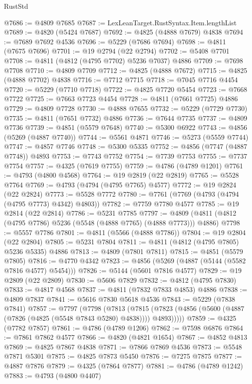 \begin{lexlean}{RustStd}
\begin{coremodule}
@7686 := @4809 @7685
@7687 := LexLeanTarget.RustSyntax.Item.lengthList
@7689 := @4820 (@5424 @7687)
@7692 := @4825 (@4888 @7679) @4838
@7694 := @7689 @7692 @4536
@7696 := @5229 (@7686 @7694)
@7698 := @4811 (@7675 @7696)
@7701 := @19 @2794 (@22 @2794)
@7702 := @5408 @7701
@7708 := @4811 (@4812 (@4795 @7702) @5236 @7037) @4886
@7709 := @7698 @7708
@7710 := @4809 @7709
@7712 := @4825 (@4888 @7672)
@7715 := @4825 (@4888 @7702) @4838
@7716 := @7712 @7715
@7718 := @7045 @7716 @4454
@7720 := @5229 (@7710 @7718)
@7722 := @4825 @7720 @5454
@7723 := @7668 @7722
@7725 := @7663 @7723 @4454
@7728 := @4811 (@7661 @7725) @4886
@7729 := @4809 @7728
@7730 := @4888 @7655
@7732 := @5229 (@7729 @7730)
@7735 := @4811 (@7651 @7732) @4886
@7736 := @7644 @7735
@7737 := @4809 @7736
@7739 := @4851 (@5579 @7648)
@7740 := @5300 @6922
@7743 := @4856 (@5269 (@4887 @7740))
@7744 := @5561 @4871
@7746 := @5273 (@5559 @7744)
@7747 := @4857 @7746
@7748 := @5300 @5335
@7752 := @4856 (@7747 (@4887 @7748)) @4893
@7753 := @7743 @7752
@7754 := @7739 @7753
@7755 := @7737 @7754
@7757 := @4325 (@7619 @7755)
@7759 := @4786 (@4789 @1201)
@7761 := @4793 (@4800 @4568)
@7764 := @19 @2819 (@22 @2819)
@7765 := @5528 @7764
@7769 := @4793 (@4794 (@4795 @7765) @4577)
@7772 := @19 @2824 (@22 @2824)
@7773 := @5528 @7772
@7780 := @7761 (@7769 (@4793 (@4794 (@4795 @7773) @4342) @4803))
@7782 := @7759 @7780 @4577
@7785 := @19 @2814 (@22 @2814)
@7786 := @5231 @7785
@7797 := @4809 (@4811 (@4812 (@4795 @7786) @5236 (@5548 (@4888 @7765) (@4888 @7773))) @4886)
@7798 := @5557 @7786
@7801 := @4811 (@5566 (@4888 @7786))
@7804 := @19 @2804 (@22 @2804)
@7805 := @5231 @7804
@7811 := @4811 (@4812 (@4795 @7805) @5236 @5335) @4886
@7813 := @4809 (@7801 @7811)
@7815 := @4851 (@5579 @7805)
@7816 := @4770 @4342
@7823 := @4856 (@5269 (@4887 (@5144 (@5582 @7816 @4577) @5454)))
@7826 := @5144 (@5601 @7816 @4577)
@7829 := @19 @2809 (@22 @2809)
@7830 := @5606 @7829
@7832 := @4812 (@4795 @7830)
@7833 := @4817 @4568
@7837 := @4811 (@7832 @7833 @4853) @4886
@7838 := @4809 @7837
@7841 := @5616 @7830 @5618 @4536
@7843 := @5229 (@7838 @7841)
@7857 := @7797
    (@7798
      (@7813
        (@7815 (@7823 (@4856 (@5600 (@4887 (@7826 (@4825 (@5548 @7843 @5280) @4838)))) @4893)))))
@7859 := @4325 (@7782 @7857)
@7861 := @4786 (@4789 @1206)
@7862 := @7598 @6876
@7864 := @7861 @7862 @4577
@7866 := @4820 (@4821 @1654)
@7867 := @4852 @4813
@7869 := @4825 @7867 @4838
@7871 := @7866 @7869 @4536
@7873 := @5548 @7871 @5301
@7875 := @4825 @7873 @5450
@7876 := @7275 @7875
@7877 := @4887 @7876
@7879 := @4325 (@7864 @7877)
@7881 := @4786 (@4789 @1242)
@7883 := @4793 (@4800 @4407)

\end{coremodule}
\end{lexlean}
